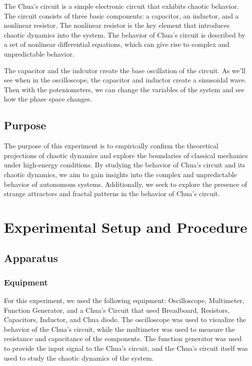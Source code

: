 \documentclass[12pt]{article}
\begin{document}
                The Chua's circuit is a simple electronic circuit that exhibits chaotic behavior. The circuit consists of
                three basic components: a capacitor, an inductor, and a nonlinear resistor. The nonlinear resistor is the
                key element that introduces chaotic dynamics into the system. The behavior of Chua's circuit is described
                by a set of nonlinear differential equations, which can give rise to complex and unpredictable behavior.

                The capacitor and the indcutor create the base oscillation of the circuit. As we'll see when in the oscilloscope,
                the capacitor and inductor create a sinusoidal wave. Then with the poteniometers, we can change the variables of the 
                system and see how the phase space changes.


        \subsection{Purpose}
                The purpose of this experiment is to empirically confirm the theoretical projections of chaotic dynamics and 
                explore the boundaries of classical mechanics under high-energy conditions. By studying the behavior of Chua's 
                circuit and its chaotic dynamics, we aim to gain insights into the complex and unpredictable behavior of 
                autonomous systems. Additionally, we seek to explore the presence of strange attractors and fractal patterns 
                in the behavior of Chua's circuit.

\section{Experimental Setup and Procedure}
        \subsection{Apparatus}
                \subsubsection{Equipment}
                For this experiment, we used the following equipment: Oscilloscope, Multimeter, Function Generator, and a Chua's Circuit that used Breadboard,
                Resistors, Capacitors, Inductor, and Chua diode. The oscilloscope was used to visualize the behavior of the Chua's circuit, 
                while the multimeter was used to measure the resistance and capacitance of the components. The function generator was used to 
                provide the input signal to the Chua's circuit, and the Chua's circuit itself was used to study the chaotic dynamics of the system.
                        
\end{document}
